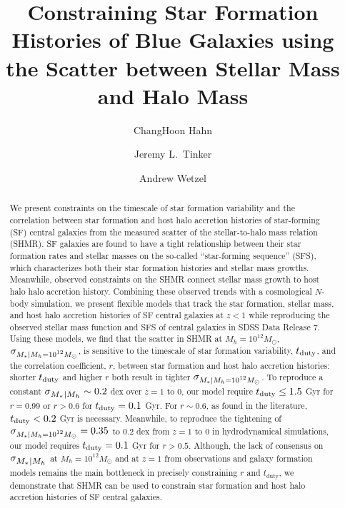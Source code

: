 \documentclass[12pt, letterpaper, preprint, tighten]{aastex62}
\newcommand{\tduty}{t_{\rm duty}}
\newcommand{\siglogm}{\sigma_{\scaleto{M_*|M_h}{8pt}}}
\newcommand{\sigtwe}{\sigma_{\scaleto{M_*|M_h=10^{12}M_\odot}{8pt}}}
\begin{document}
\sloppy\sloppypar\frenchspacing

\title{Constraining Star Formation Histories of Blue Galaxies using the Scatter between Stellar Mass and Halo Mass} 
\author{ChangHoon Hahn}
\author{Jeremy L.~Tinker}
\author{Andrew Wetzel}

\begin{abstract}
    We present constraints on the timescale of star formation variability and 
    the correlation between star formation and host halo accretion histories 
    of star-forming (SF) central galaxies from the measured scatter of the stellar-to-halo 
    mass relation (SHMR). SF galaxies are found to have a tight relationship
    between their star formation rates and stellar masses on the so-called ``star-forming
    sequence'' (SFS), which characterizes both their star formation histories and
    stellar mass growths. Meanwhile, observed constraints on the SHMR connect 
    stellar mass growth to host halo halo accretion history. Combining these observed 
    trends with a cosmological $N$-body simulation, we present flexible models that 
    track the star formation, stellar mass, and host halo accretion histories of 
    SF central galaxies at $z < 1$ while reproducing the observed stellar 
    mass function and SFS of central galaxies in SDSS Data Release 7. Using these 
    models, we find that the scatter in SHMR at $M_h{=}10^{12}M_\odot$, $\sigtwe$, 
    is sensitive to the timescale of star 
    formation variability, $t_{\rm duty}$, and the correlation coefficient, $r$, 
    between star formation and host halo accretion histories: shorter $\tduty$ and 
    higher $r$ both result in tighter $\sigtwe$. To reproduce a constant 
    $\siglogm \sim 0.2$ dex over $z=1$ to 0, our model require $\tduty \leq 1.5$ Gyr 
    for $r = 0.99$ or $r > 0.6$ for $\tduty = 0.1$ Gyr. For $r \sim 0.6$, as found 
    in the literature, $\tduty < 0.2$ Gyr is necessary. Meanwhile, to reproduce 
    the tightening of $\sigtwe = 0.35$ to 0.2 dex from $z=1$ to 0 in hydrodynamical 
    simulations, our model requires $\tduty = 0.1$ Gyr for $r > 0.5$. 
    Although, the lack of consensus on $\siglogm$ at $M_h=10^{12}M_\odot$ and at 
    $z=1$ from observations and galaxy formation models remains the main bottleneck 
    in precisely constraining $r$ and $t_\mathrm{duty}$, we demonstrate that SHMR 
    can be used to constrain star formation and host halo accretion histories of 
    SF central galaxies.
\end{abstract}
\end{document}

